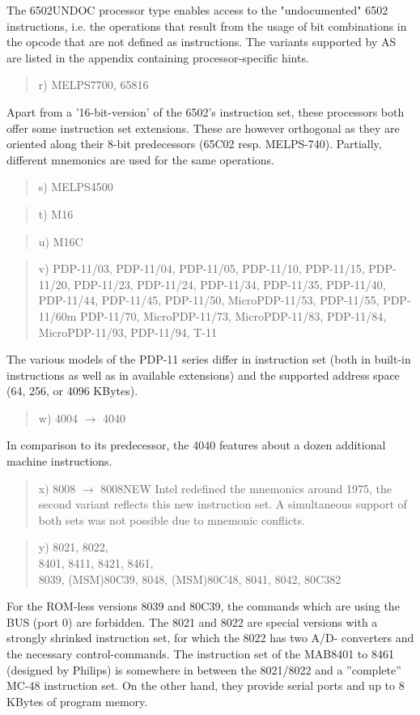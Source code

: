 \documentclass[12pt,twoside]{report}
\begin{document}
The 6502UNDOC processor type enables access to the "undocumented"
6502 instructions, i.e. the operations that result from the usage of bit
combinations in the opcode that are not defined as instructions.  The
variants supported by AS are listed in the appendix containing processor-specific
hints.
\begin{quote}
r) MELPS7700, 65816
\end{quote}
Apart from a '16-bit-version' of the 6502's instruction set, these
processors both offer some instruction set extensions.  These are
however orthogonal as they are oriented along their 8-bit
predecessors (65C02 resp. MELPS-740).  Partially, different
mnemonics are used for the same operations.
\begin{quote}
s) MELPS4500
\end{quote}
\begin{quote}
t) M16
\end{quote}
\begin{quote}
u) M16C
\end{quote}
\begin{quote}
v) PDP-11/03, PDP-11/04, PDP-11/05, PDP-11/10,
   PDP-11/15, PDP-11/20, PDP-11/23, PDP-11/24,
   PDP-11/34, PDP-11/35, PDP-11/40, PDP-11/44,
   PDP-11/45, PDP-11/50, MicroPDP-11/53,
   PDP-11/55, PDP-11/60m PDP-11/70, MicroPDP-11/73,
   MicroPDP-11/83, PDP-11/84, MicroPDP-11/93,
   PDP-11/94, T-11
\end{quote}
The various models of the PDP-11 series differ in instruction
set (both in built-in instructions as well as in available extensions)
and the supported address space (64, 256, or 4096 KBytes).
\begin{quote}
w) 4004 $\rightarrow$ 4040
\end{quote}
In comparison to its predecessor, the 4040 features about a dozen
additional machine instructions.
\begin{quote}
x) 8008 $\rightarrow$ 8008NEW
Intel redefined the mnemonics around 1975, the second variant reflects
this new instruction set.  A simultaneous support of both sets was not
possible due to mnemonic conflicts.
\end{quote}
\begin{quote}
y) 8021, 8022, \\
   8401, 8411, 8421, 8461, \\
   8039, (MSM)80C39, 8048, (MSM)80C48, 8041, 8042, 80C382
\end{quote}
For the ROM-less versions 8039 and 80C39, the commands which are
using the BUS (port 0) are forbidden.  The 8021 and 8022 are special
versions with a strongly shrinked instruction set, for which the 8022
has two A/D- converters and the necessary control-commands.  The 
instruction set of the MAB8401 to 8461 (designed by Philips) is
somewhere in between the 8021/8022 and a ''complete'' MC-48 instruction
set.  On the other hand, they provide serial ports and up to 8 KBytes
of program memory.
\end{document}

